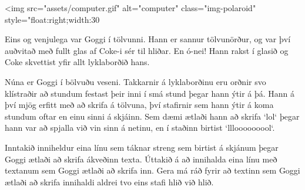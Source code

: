 
<img src="assets/computer.gif" alt="computer" class="img-polaroid" style="float:right;width:30%

Eins og venjulega var Goggi í tölvunni. Hann er sannur tölvunörður, og var því
auðvitað með fullt glas af Coke-i sér til hliðar. En ó-nei! Hann rakst í glasið
og Coke skvettist yfir allt lyklaborðið hans.

Núna er Goggi í bölvuðu veseni. Takkarnir á lyklaborðinu eru orðnir svo
klístraðir að stundum festast þeir inni í smá stund þegar hann ýtir á þá. Hann
á því mjög erfitt með að skrifa á tölvuna, því stafirnir sem hann ýtir á koma
stundum oftar en einu sinni á skjáinn. Sem dæmi ætlaði hann að skrifa `lol`
þegar hann var að spjalla við vin sinn á netinu, en í staðinn birtist
`lllooooooool`.

Inntakið inniheldur eina línu sem táknar streng sem birtist á skjánum þegar
Goggi ætlaði að skrifa ákveðinn texta. Úttakið á að innihalda eina línu með
textanum sem Goggi ætlaði að skrifa inn. Gera má ráð fyrir að textinn sem Goggi
ætlaði að skrifa innihaldi aldrei tvo eins stafi hlið við hlið.
